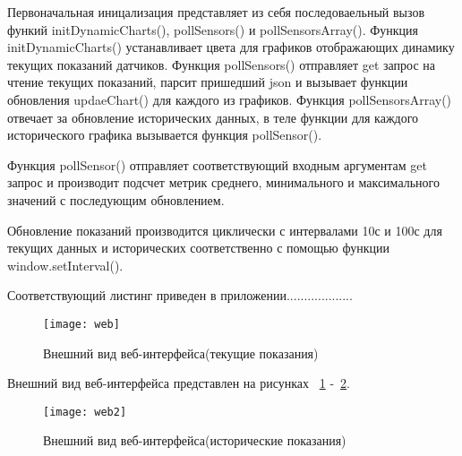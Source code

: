 Первоначальная иницализация представляет из себя последоваельный вызов функий initDynamicCharts(), pollSensors() и pollSensorsArray(). Функция initDynamicCharts() устанавливает цвета для графиков отображающих динамику текущих показаний датчиков.  Функция pollSensors() отправляет get запрос на чтение текущих показаний, парсит пришедший json и вызывает функции обновления updaeChart() для каждого из графиков. 
Функция pollSensorsArray() отвечает за обновление исторических данных, в теле функции для каждого исторического графика вызывается функция pollSensor(). 

Функция pollSensor() отправляет соответствующий входным аргументам get запрос и производит подсчет метрик среднего, минимального и максимального значений с последующим обновлением.

Обновление показаний производится циклически с интервалами 10с и 100с для текущих данных и исторических соответственно с помощью функции window.setInterval(). 

Соответствующий листинг приведен в приложении...................
\begin{figure}[h]
	\centering
	\texttt{[image: web]}
	\caption{Внешний вид веб-интерфейса(текущие показания)}
	\label{fig:web}
\end{figure}

Внешний вид веб-интерфейса представлен на рисунках ~\ref{fig:web} -~\ref{fig:web2}.

\begin{figure}[h]
	\centering
	\texttt{[image: web2]}
	\caption{Внешний вид веб-интерфейса(исторические показания)}
	\label{fig:web2}
\end{figure}





%
%





